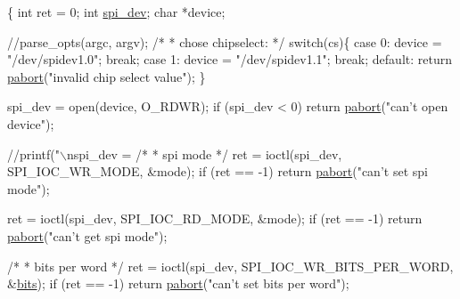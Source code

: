 \begin{DoxyCode}
\{
        \textcolor{keywordtype}{int} ret = 0;
        \textcolor{keywordtype}{int} \hyperlink{CommunicationV0_2communication_8c_a4788f0a5355494bc6c13690e28f43783}{spi\_dev};
        \textcolor{keywordtype}{char} *device;

        \textcolor{comment}{//parse\_opts(argc, argv);}
        \textcolor{comment}{/*}
\textcolor{comment}{         * chose chipselect:}
\textcolor{comment}{         */}
        \textcolor{keywordflow}{switch}(cs)\{
          \textcolor{keywordflow}{case} 0:
            device = \textcolor{stringliteral}{"/dev/spidev1.0"};
            \textcolor{keywordflow}{break};
          \textcolor{keywordflow}{case} 1:
            device = \textcolor{stringliteral}{"/dev/spidev1.1"};
            \textcolor{keywordflow}{break};
          \textcolor{keywordflow}{default}:
            \textcolor{keywordflow}{return} \hyperlink{communication_2spi__functions_8c_aabfca8320b0c76774f01467703e17302}{pabort}(\textcolor{stringliteral}{"invalid chip select value"});
        \}
            
        
        spi\_dev = open(device, O\_RDWR);
        \textcolor{keywordflow}{if} (spi\_dev < 0)
                \textcolor{keywordflow}{return} \hyperlink{communication_2spi__functions_8c_aabfca8320b0c76774f01467703e17302}{pabort}(\textcolor{stringliteral}{"can't open device"});
\textcolor{comment}{//printf("\(\backslash\)nspi\_dev = %
        \textcolor{comment}{/*}
\textcolor{comment}{         * spi mode}
\textcolor{comment}{         */}
        ret = ioctl(spi\_dev, SPI\_IOC\_WR\_MODE, &mode);
        \textcolor{keywordflow}{if} (ret == -1)
                \textcolor{keywordflow}{return} \hyperlink{communication_2spi__functions_8c_aabfca8320b0c76774f01467703e17302}{pabort}(\textcolor{stringliteral}{"can't set spi mode"});

        ret = ioctl(spi\_dev, SPI\_IOC\_RD\_MODE, &mode);
        \textcolor{keywordflow}{if} (ret == -1)
                \textcolor{keywordflow}{return} \hyperlink{communication_2spi__functions_8c_aabfca8320b0c76774f01467703e17302}{pabort}(\textcolor{stringliteral}{"can't get spi mode"});

        \textcolor{comment}{/*}
\textcolor{comment}{         * bits per word}
\textcolor{comment}{         */}
        ret = ioctl(spi\_dev, SPI\_IOC\_WR\_BITS\_PER\_WORD, &\hyperlink{communication_2spi__functions_8c_a46a6da6b1936191571fd30b2a749f38c}{bits});
        \textcolor{keywordflow}{if} (ret == -1)
                \textcolor{keywordflow}{return} \hyperlink{communication_2spi__functions_8c_aabfca8320b0c76774f01467703e17302}{pabort}(\textcolor{stringliteral}{"can't set bits per word"});

}
\end{DoxyCode}
